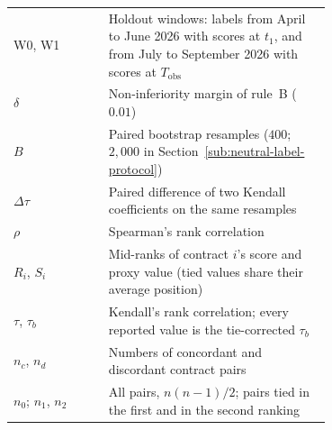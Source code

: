 \begin{longtable}{lp{0.70\linewidth}}
W0, W1 & Holdout windows: labels from April to June 2026 with scores at $t_1$, and from July to September 2026 with scores at $T_{\mathrm{obs}}$ \\
$\delta$ & Non-inferiority margin of rule~B ($0.01$) \\
$B$ & Paired bootstrap resamples ($400$; $2{,}000$ in Section~\ref{sub:neutral-label-protocol}) \\
$\Delta\tau$ & Paired difference of two Kendall coefficients on the same resamples \\
$\rho$ & Spearman's rank correlation \\
$R_i$, $S_i$ & Mid-ranks of contract $i$'s score and proxy value (tied values share their average position) \\
$\tau$, $\tau_b$ & Kendall's rank correlation; every reported value is the tie-corrected $\tau_b$ \\
$n_c$, $n_d$ & Numbers of concordant and discordant contract pairs \\
$n_0$; $n_1$, $n_2$ & All pairs, $n(n-1)/2$; pairs tied in the first and in the second ranking \\
\end{longtable}
\endgroup


